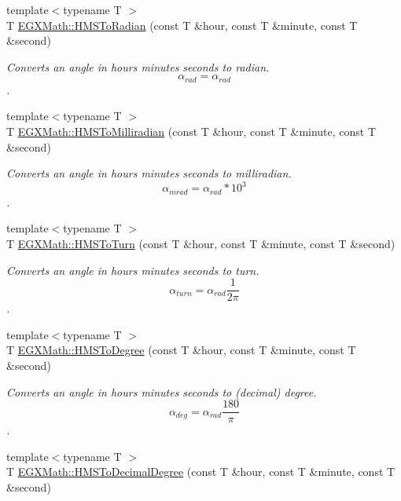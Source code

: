 \begin{DoxyCompactItemize}
\item 
{\footnotesize template$<$typename T $>$ }\\T \mbox{\hyperlink{group___e_g_x_math-_conversions-_angle_conversions-_h_m_s_ga5f0873c7c013ba2c5784de3725f2c042}{E\+G\+X\+Math\+::\+H\+M\+S\+To\+Radian}} (const T \&hour, const T \&minute, const T \&second)
\begin{DoxyCompactList}\small\item\em Converts an angle in hours minutes seconds to radian. \[\alpha_{rad}=\alpha_{rad}\]. \end{DoxyCompactList}\item 
{\footnotesize template$<$typename T $>$ }\\T \mbox{\hyperlink{group___e_g_x_math-_conversions-_angle_conversions-_h_m_s_ga175cead130e511e2c61545d71e3dc2f3}{E\+G\+X\+Math\+::\+H\+M\+S\+To\+Milliradian}} (const T \&hour, const T \&minute, const T \&second)
\begin{DoxyCompactList}\small\item\em Converts an angle in hours minutes seconds to milliradian. \[\alpha_{mrad}=\alpha_{rad}*10^3\]. \end{DoxyCompactList}\item 
{\footnotesize template$<$typename T $>$ }\\T \mbox{\hyperlink{group___e_g_x_math-_conversions-_angle_conversions-_h_m_s_ga9352ac15414f9e52351f21d7976964db}{E\+G\+X\+Math\+::\+H\+M\+S\+To\+Turn}} (const T \&hour, const T \&minute, const T \&second)
\begin{DoxyCompactList}\small\item\em Converts an angle in hours minutes seconds to turn. \[\alpha_{turn}=\alpha_{rad}\frac{1}{2 \pi}\]. \end{DoxyCompactList}\item 
{\footnotesize template$<$typename T $>$ }\\T \mbox{\hyperlink{group___e_g_x_math-_conversions-_angle_conversions-_h_m_s_ga281ee88be0cb04f58bdf19efcef58146}{E\+G\+X\+Math\+::\+H\+M\+S\+To\+Degree}} (const T \&hour, const T \&minute, const T \&second)
\begin{DoxyCompactList}\small\item\em Converts an angle in hours minutes seconds to (decimal) degree. \[\alpha_{deg}=\alpha_{rad}\frac{180}{\pi}\]. \end{DoxyCompactList}\item 
{\footnotesize template$<$typename T $>$ }\\T \mbox{\hyperlink{group___e_g_x_math-_conversions-_angle_conversions-_h_m_s_gacc6ae7123e7e54ddf8538cd6ab0198ce}{E\+G\+X\+Math\+::\+H\+M\+S\+To\+Decimal\+Degree}} (const T \&hour, const T \&minute, const T \&second)

\end{DoxyCompactItemize}

